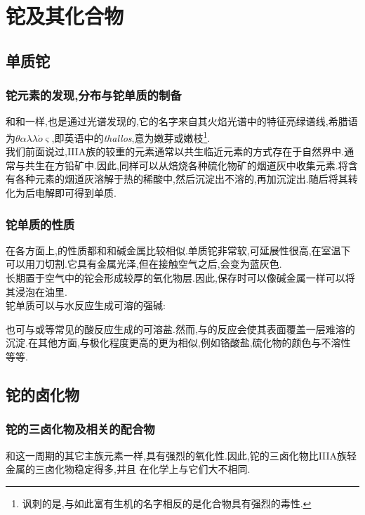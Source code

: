 \documentclass{ctexart}
\begin{document}
\section{铊及其化合物}
\subsection{单质铊}
\subsubsection{铊元素的发现,分布与铊单质的制备}
和和一样,也是通过光谱发现的,它的名字来自其火焰光谱中的特征亮绿谱线,希腊语为$\theta\alpha\lambda\lambda\acute{o}\varsigma$,即英语中的\textit{thallos},意为嫩芽或嫩枝\footnote{讽刺的是,与如此富有生机的名字相反的是化合物具有强烈的毒性.}.\\
\indent 我们前面说过,IIIA族的较重的元素通常以共生临近元素的方式存在于自然界中.通常与共生在方铅矿中.因此,同样可以从焙烧各种硫化物矿的烟道灰中收集元素.将含有各种元素的烟道灰溶解于热的稀酸中,然后沉淀出不溶的,再加沉淀出.随后将其转化为后电解即可得到单质.
\subsubsection{铊单质的性质}
在各方面上,的性质都和和碱金属比较相似.单质铊非常软,可延展性很高,在室温下可以用刀切割.它具有金属光泽,但在接触空气之后,会变为蓝灰色.\\
\indent 长期置于空气中的铊会形成较厚的氧化物层.因此,保存时可以像碱金属一样可以将其浸泡在油里.\\
\indent 铊单质可以与水反应生成可溶的强碱:
\begin{center}
\end{center}
也可与或等常见的酸反应生成的可溶盐.然而,与的反应会使其表面覆盖一层难溶的沉淀.在其他方面,与极化程度更高的更为相似,例如铬酸盐,硫化物的颜色与不溶性等等.
\subsection{铊的卤化物}
\subsubsection{铊的三卤化物及相关的配合物}
和这一周期的其它主族元素一样,具有强烈的氧化性.因此,铊的三卤化物比IIIA族轻金属的三卤化物稳定得多,并且
在化学上与它们大不相同.
\end{document}
